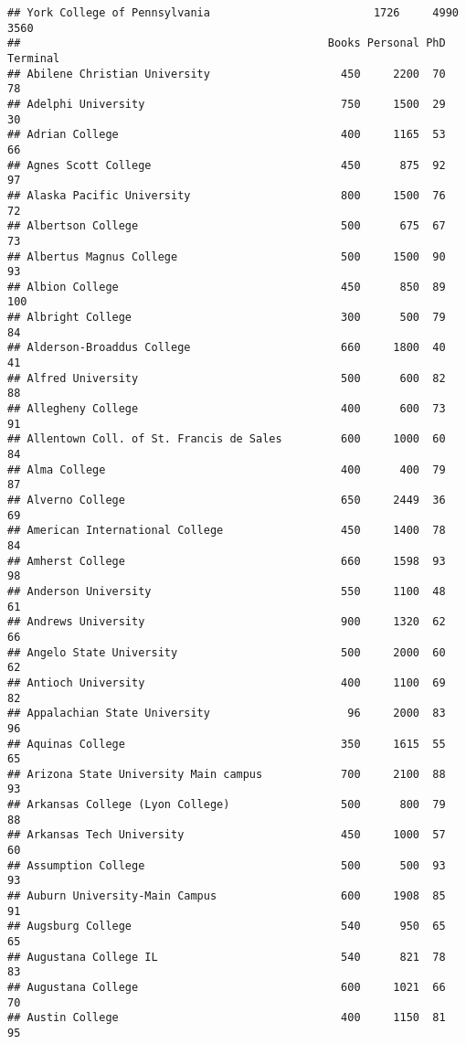 \documentclass[
]{article}
\begin{document}
\begin{verbatim}
## York College of Pennsylvania                         1726     4990       3560
##                                               Books Personal PhD Terminal
## Abilene Christian University                    450     2200  70       78
## Adelphi University                              750     1500  29       30
## Adrian College                                  400     1165  53       66
## Agnes Scott College                             450      875  92       97
## Alaska Pacific University                       800     1500  76       72
## Albertson College                               500      675  67       73
## Albertus Magnus College                         500     1500  90       93
## Albion College                                  450      850  89      100
## Albright College                                300      500  79       84
## Alderson-Broaddus College                       660     1800  40       41
## Alfred University                               500      600  82       88
## Allegheny College                               400      600  73       91
## Allentown Coll. of St. Francis de Sales         600     1000  60       84
## Alma College                                    400      400  79       87
## Alverno College                                 650     2449  36       69
## American International College                  450     1400  78       84
## Amherst College                                 660     1598  93       98
## Anderson University                             550     1100  48       61
## Andrews University                              900     1320  62       66
## Angelo State University                         500     2000  60       62
## Antioch University                              400     1100  69       82
## Appalachian State University                     96     2000  83       96
## Aquinas College                                 350     1615  55       65
## Arizona State University Main campus            700     2100  88       93
## Arkansas College (Lyon College)                 500      800  79       88
## Arkansas Tech University                        450     1000  57       60
## Assumption College                              500      500  93       93
## Auburn University-Main Campus                   600     1908  85       91
## Augsburg College                                540      950  65       65
## Augustana College IL                            540      821  78       83
## Augustana College                               600     1021  66       70
## Austin College                                  400     1150  81       95

\end{verbatim}
\end{document}
